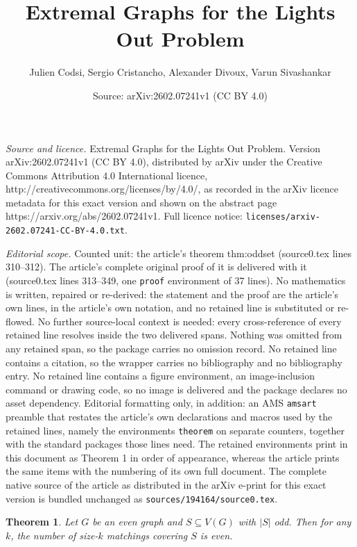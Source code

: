 \documentclass[10pt,a4paper]{amsart}
\title{Extremal Graphs for the Lights Out Problem}
\author{Julien Codsi, Sergio Cristancho, Alexander Divoux, Varun Sivashankar}
\date{Source: arXiv:2602.07241v1 (CC BY 4.0)}
\newtheorem{theorem}{Theorem}
\begin{document}
\maketitle

\noindent\emph{Source and licence.} Extremal Graphs for the Lights Out Problem. Version arXiv:2602.07241v1 (CC BY 4.0), distributed by arXiv under the Creative Commons Attribution 4.0 International licence, http://creativecommons.org/licenses/by/4.0/, as recorded in the arXiv licence metadata for this exact version and shown on the abstract page https://arxiv.org/abs/2602.07241v1. Full licence notice: \texttt{licenses/arxiv-2602.07241-CC-BY-4.0.txt}.\par\smallskip

\noindent\textit{Editorial scope.} Counted unit: the article's theorem thm:oddset (source0.tex lines 310--312). The article's complete original proof of it is delivered with it (source0.tex lines 313--349, one \texttt{proof} environment of 37 lines). No mathematics is written, repaired or re-derived: the statement and the proof are the article's own lines, in the article's own notation, and no retained line is substituted or re-flowed.  No further source-local context is needed: every cross-reference of every retained line resolves inside the two delivered spans.  Nothing was omitted from any retained span, so the package carries no omission record.  No retained line contains a citation, so the wrapper carries no bibliography and no bibliography entry.  No retained line contains a figure environment, an image-inclusion command or drawing code, so no image is delivered and the package declares no asset dependency.  Editorial formatting only, in addition: an AMS \texttt{amsart} preamble that restates the article's own declarations and macros used by the retained lines, namely the environments \texttt{theorem} on separate counters, together with the standard packages those lines need.  The retained environments print in this document as Theorem 1 in order of appearance, whereas the article prints the same items with the numbering of its own full document.  The complete native source of the article as distributed in the arXiv e-print for this exact version is bundled unchanged as \texttt{sources/194164/source0.tex}.
\begin{theorem}\label{thm:oddset}
    Let $G$ be an even graph and $S\subseteq V(G)$ with $|S|$ odd. Then for any $k$, the number of size-$k$ matchings covering $S$ is even. 
\end{theorem}
\end{document}
